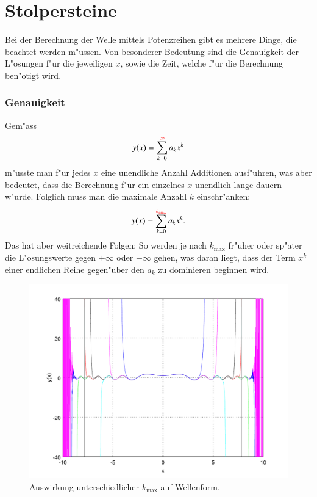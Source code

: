 \section{Stolpersteine}

Bei der Berechnung der Welle mittels Potenzreihen gibt es mehrere Dinge, die 
beachtet werden m"ussen. Von besonderer Bedeutung sind die Genauigkeit der 
L"osungen f"ur die jeweiligen $x$, sowie die Zeit, welche f"ur die 
Berechnung ben"otigt wird.

\subsubsection{Genauigkeit}
Gem"ass
\begin{equation*}
	y(x) = \sum_{k=0}^{\textcolor{red}{\infty}}a_kx^k
\end{equation*}
m"usste man f"ur jedes $x$ eine unendliche Anzahl Additionen ausf"uhren, was 
aber bedeutet, dass die Berechnung f"ur ein einzelnes $x$ unendlich lange 
dauern w"urde. Folglich muss man die maximale Anzahl $k$ einschr"anken:
\begin{equation*}
	y(x) = \sum_{k=0}^{\textcolor{red}{k_{\text{max}}}}a_kx^k.
\end{equation*}
Das hat aber weitreichende Folgen: So werden je nach $k_{\text{max}}$ fr"uher 
oder sp"ater die L"osungswerte gegen $+\infty$ oder $-\infty$ gehen, was daran 
liegt, dass der Term $x^k$ einer endlichen Reihe gegen"uber den $a_k$ zu 
dominieren beginnen wird.

\begin{figure}
	\includegraphics[width=1\hsize]{./wellen/images/kmax/kmax.pdf}
	\caption{Auswirkung unterschiedlicher $k_{\text{max}}$ auf Wellenform.}
	\label{fig:wellen:variablekmax}
\end{figure}

